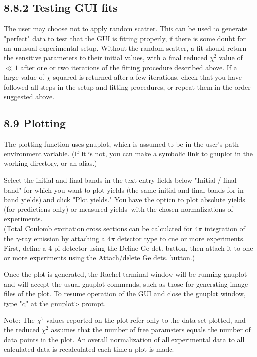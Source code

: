 \documentclass[10pt]{article}
\begin{document}
\subsection*{8.8.2 Testing GUI fits}
The user may choose not to apply random scatter. This can be used to generate "perfect" data to test that the GUI is fitting properly, if there is some doubt for an unusual experimental setup. Without the random scatter, a fit should return the sensitive parameters to their initial values, with a final reduced $\chi^{2}$ value of $\ll 1$ after one or two iterations of the fitting procedure described above. If a large value of $\chi$-squared is returned after a few iterations, check that you have followed all steps in the setup and fitting procedures, or repeat them in the order suggested above.

\subsection*{8.9 Plotting}
The plotting function uses gnuplot, which is assumed to be in the user's path environment variable. (If it is not, you can make a symbolic link to gnuplot in the working directory, or an alias.)

Select the initial and final bands in the text-entry fields below "Initial / final band" for which you want to plot yields (the same initial and final bands for in-band yields) and click "Plot yields." You have the option to plot absolute yields (for predictions only) or measured yields, with the chosen normalizations of experiments.\\
(Total Coulomb excitation cross sections can be calculated for $4 \pi$ integration of the $\gamma$-ray emission by attaching a $4 \pi$ detector type to one or more experiments. First, define a 4 pi detector using the Define Ge det. button, then attach it to one or more experiments using the Attach/delete Ge dets. button.)

Once the plot is generated, the Rachel terminal window will be running gnuplot and will accept the usual gnuplot commands, such as those for generating image files of the plot. To resume operation of the GUI and close the gnuplot window, type "q" at the gnuplot> prompt.

Note: The $\chi^{2}$ values reported on the plot refer only to the data set plotted, and the reduced $\chi^{2}$ assumes that the number of free parameters equals the number of data points in the plot. An overall normalization of all experimental data to all calculated data is recalculated each time a plot is made.
\end{document}
